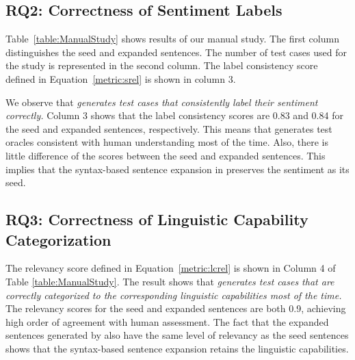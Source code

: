 


\subsection{RQ2: Correctness of Sentiment Labels}
Table~\ref{table:ManualStudy} shows results of our manual study. The first column distinguishes the seed and expanded sentences. The number of test cases used for the study is represented in the
second column. The label consistency score defined
in Equation~\ref{metric:srel} is shown in column 3.

We observe that \emph{\tool generates test cases that consistently
  label their sentiment correctly.}  Column 3 shows that the label
consistency scores are 0.83 and 0.84 for the seed and expanded
sentences, respectively.
This means that \tool generates test oracles consistent with
human understanding most of the time. Also, there is
little difference of the scores between the seed and expanded
sentences. This implies that the syntax-based sentence expansion in
\tool preserves the sentiment as its seed.


\subsection{RQ3: Correctness of Linguistic Capability Categorization}

The \lc relevancy score defined
in Equation~\ref{metric:lcrel} is shown in Column 4 of Table \ref{table:ManualStudy}. The result shows that
\emph{\tool generates test cases that are correctly categorized to the corresponding linguistic capabilities most of the time.}
The \lc relevancy scores for the seed and expanded sentences are both 0.9, achieving high order of agreement with human assessment. The fact that the expanded sentences
generated by \tool also have the same level of \lc
relevancy as the seed sentences shows that the syntax-based sentence expansion retains the linguistic capabilities.


